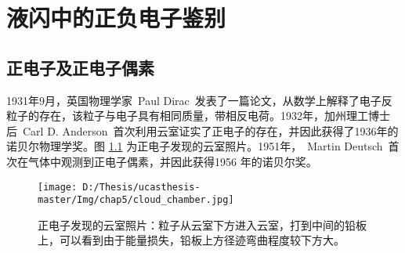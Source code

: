 
\chapter{液闪中的正负电子鉴别}
\label{chap:chap5}
\section{正电子及正电子偶素}
1931年9月，英国物理学家~Paul Dirac~发表了一篇论文，从数学上解释了电子反粒子的存在，该粒子与电子具有相同质量，带相反电荷。1932年，加州理工博士后~Carl D. Anderson~首次利用云室证实了正电子的存在，并因此获得了1936年的诺贝尔物理学奖。图
\ref{fig:p51} 为正电子发现的云室照片。1951年，~Martin Deutsch~首次在气体中观测到正电子偶素，并因此获得1956 年的诺贝尔奖。
\begin{figure}[!htb]
  \centering
  \texttt{[image: D:/Thesis/ucasthesis-master/Img/chap5/cloud\_chamber.jpg]}
  \caption{正电子发现的云室照片：粒子从云室下方进入云室，打到中间的铅板上，可以看到由于能量损失，铅板上方径迹弯曲程度较下方大。}
  \label{fig:p51}
\end{figure}

